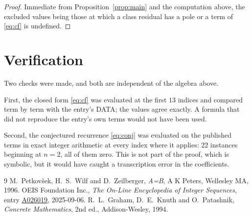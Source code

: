 \documentclass[11pt,a4paper]{article}
\theoremstyle{plain}
\theoremstyle{definition}
\begin{document}
\begin{proof}
Immediate from Proposition~\ref{prop:main} and the computation above, the excluded values
being those at which a class residual has a pole or a term of \eqref{eq:cf} is undefined.
\end{proof}

\section{Verification}

Two checks were made, and both are independent of the algebra above.

First, the closed form \eqref{eq:cf} was evaluated at the first $13$ indices and
compared term by term with the entry's DATA; the values agree exactly. A formula that did
not reproduce the entry's own terms would not have been used.

Second, the conjectured recurrence \eqref{eq:conj} was evaluated on the published terms in
exact integer arithmetic at every index where it applies: $22$ instances beginning at
$n=2$, all of them zero. This is not part of the proof, which is symbolic, but it
would have caught a transcription error in the coefficients.

\begin{thebibliography}{9}
 M.~Petkov\v{s}ek, H.~S.~Wilf and D.~Zeilberger, \emph{A=B}, A K Peters,
Wellesley MA, 1996.
 OEIS Foundation Inc., \emph{The On-Line Encyclopedia of Integer Sequences},
entry \href{https://oeis.org/A026019}{A026019}, 2025-09-06.
 R.~L.~Graham, D.~E.~Knuth and O.~Patashnik, \emph{Concrete Mathematics},
2nd ed., Addison-Wesley, 1994.
\end{thebibliography}
\end{document}
